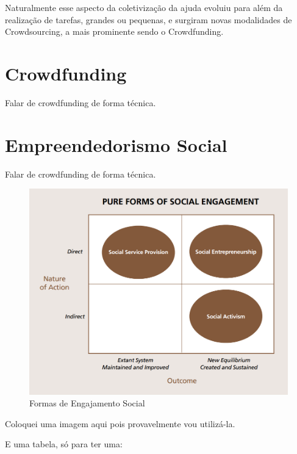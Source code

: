 Naturalmente esse aspecto da coletivização da ajuda evoluiu para além da realização de tarefas, grandes ou pequenas, e surgiram novas modalidades de Crowdsourcing, a mais prominente sendo o Crowdfunding.



\section{Crowdfunding}
Falar de crowdfunding de forma técnica.



\section{Empreendedorismo Social}
Falar de crowdfunding de forma técnica.

\begin{figure}[H]
  \centering
  \includegraphics[scale=0.4]{imagens/formas-engajamento-social}
  \caption{Formas de Engajamento Social}
  \label{Rótulo da Imagem}
\end{figure}

Coloquei uma imagem aqui pois provavelmente vou utilizá-la.

E uma tabela, só para ter uma:

